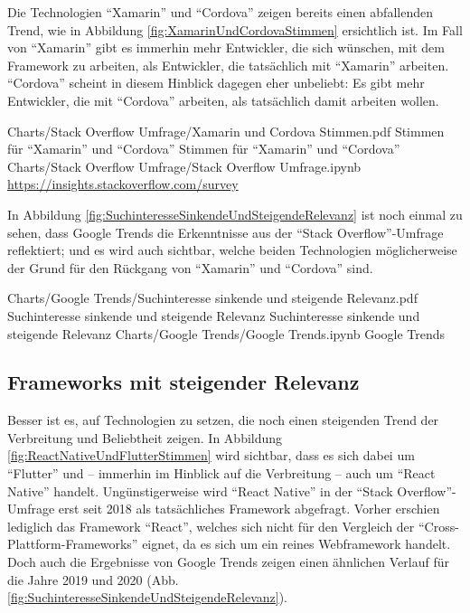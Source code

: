 Die Technologien \enquote{Xamarin} und \enquote{Cordova} zeigen bereits einen abfallenden Trend, wie in Abbildung \ref{fig:XamarinUndCordovaStimmen} ersichtlich ist.
Im Fall von \enquote{Xamarin} gibt es immerhin mehr Entwickler, die sich wünschen, mit dem Framework zu arbeiten, als Entwickler, die tatsächlich mit \enquote{Xamarin} arbeiten.
\enquote{Cordova} scheint in diesem Hinblick dagegen eher unbeliebt: Es gibt mehr Entwickler, die mit \enquote{Cordova} arbeiten, als tatsächlich damit arbeiten wollen.

\begin{alexfigurewithnotebook}{Charts/Stack Overflow Umfrage/Xamarin und Cordova Stimmen.pdf}
	{Stimmen für \enquote{Xamarin} und \enquote{Cordova}}
	{Stimmen für \enquote{Xamarin} und \enquote{Cordova}}
	{Charts/Stack Overflow Umfrage/Stack Overflow Umfrage.ipynb}
	{\url{https://insights.stackoverflow.com/survey}}
	\label{fig:XamarinUndCordovaStimmen}

\end{alexfigurewithnotebook}


In Abbildung \ref{fig:SuchinteresseSinkendeUndSteigendeRelevanz} ist noch einmal zu sehen, dass Google Trends die Erkenntnisse aus der \enquote{Stack Overflow}-Umfrage reflektiert;
und es wird auch sichtbar, welche beiden Technologien möglicherweise der Grund für den Rückgang von \enquote{Xamarin} und \enquote{Cordova} sind.

\begin{alexfigurewithnotebook}{Charts/Google Trends/Suchinteresse sinkende und steigende Relevanz.pdf}
	{Suchinteresse sinkende und steigende Relevanz}
	{Suchinteresse sinkende und steigende Relevanz}
	{Charts/Google Trends/Google Trends.ipynb}
	{Google Trends}
	\label{fig:SuchinteresseSinkendeUndSteigendeRelevanz}

\end{alexfigurewithnotebook}

\subsection{Frameworks mit steigender Relevanz}

Besser ist es, auf Technologien zu setzen, die noch einen steigenden Trend der Verbreitung und Beliebtheit zeigen.
In Abbildung \ref{fig:ReactNativeUndFlutterStimmen} wird sichtbar, dass es sich dabei um \enquote{Flutter} und -- immerhin im Hinblick auf die Verbreitung -- auch um \enquote{React Native} handelt.
Ungünstigerweise wird \enquote{React Native} in der \enquote{Stack Overflow}-Umfrage erst seit 2018 als tatsächliches Framework abgefragt.
Vorher erschien lediglich das Framework \enquote{React}, welches sich nicht für den Vergleich der \enquote{Cross-Plattform-Frameworks} eignet, da es sich um ein reines Webframework handelt.
Doch auch die Ergebnisse von Google Trends zeigen einen ähnlichen Verlauf für die Jahre 2019 und 2020 (Abb. \ref{fig:SuchinteresseSinkendeUndSteigendeRelevanz}).

